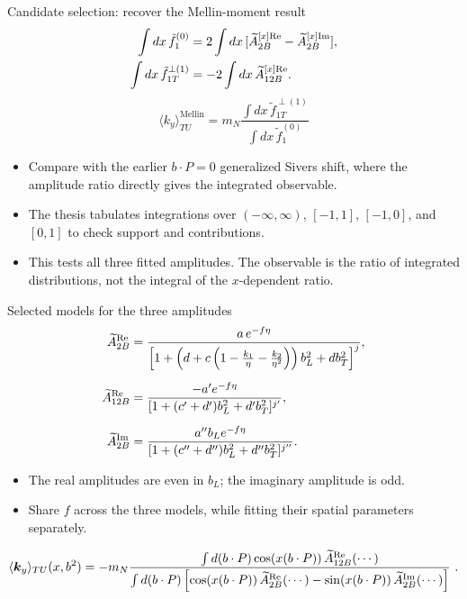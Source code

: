 \begin{frame}{Candidate selection: recover the Mellin-moment result}
\small
\begin{align*}
\int dx\,\tilde f_1^{(0)}&=2\int dx\,[\widetilde{A}_{2B}^{[x]\text{Re}}-\widetilde{A}_{2B}^{[x]\text{Im}}],\\
\int dx\,\tilde f_{1T}^{\perp(1)}&=-2\int dx\,\widetilde{A}_{12B}^{[x]\text{Re}}.
\end{align*}
\[
\boxed{\langle k_y\rangle_{TU}^{\text{Mellin}}
=m_N\frac{\int dx\,\tilde f_{1T}^{\perp(1)}}{\int dx\,\tilde f_1^{(0)}}}
\]
\begin{itemize}
\item Compare with the earlier $b\cdot P=0$ generalized Sivers shift, where the amplitude ratio directly gives the integrated observable.
\item The thesis tabulates integrations over $(-\infty,\infty)$, $[-1,1]$, $[-1,0]$, and $[0,1]$ to check support and contributions.
\item This tests all three fitted amplitudes. The observable is the ratio of integrated distributions, not the integral of the $x$-dependent ratio.
\end{itemize}
\end{frame}

\begin{frame}{Selected models for the three amplitudes}
\begin{align*}
\widetilde{A}_{2B}^{\text{Re}}&=\frac{a\,e^{-f\eta}}{\left[1+\left(d+c\left(1-\frac{k_1}{\eta}-\frac{k_2}{\eta^2}\right)\right)b_L^2+db_T^2\right]^j},\\[2mm]
\widetilde{A}_{12B}^{\text{Re}}&=\frac{-a'e^{-f\eta}}{[1+(c'+d')b_L^2+d'b_T^2]^{j'}},\\[2mm]
\widetilde{A}_{2B}^{\text{Im}}&=\frac{a''b_Le^{-f\eta}}{[1+(c''+d'')b_L^2+d''b_T^2]^{j''}}.
\end{align*}
\begin{itemize}
\item The real amplitudes are even in $b_L$; the imaginary amplitude is odd.
\item Share $f$ across the three models, while fitting their spatial parameters separately.
\end{itemize}
\[
\langle \boldsymbol{k}_y \rangle_{TU} (x,b^2)= -m_N \frac{\int d(b\cdot P) \cos\!\left(x(b\cdot P)\right)\widetilde{A}_{12B}^{\text{Re}}(\cdots)}{\int d(b\cdot P)\left[\cos\!\left(x(b\cdot P)\right)\widetilde{A}_{2B}^{\text{Re}}(\cdots)-\sin\!\left(x(b\cdot P)\right)\widetilde{A}_{2B}^{\text{Im}}(\cdots)\right]}\ .
\]
\end{frame}


